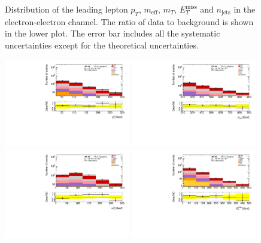 \begin{figure}[htbp]
\begin{center}
\end{center}
\caption{Distribution of the  leading lepton $p_T$, $m_{\text{eff}}$, $m_T$, $E_{T}^{\text{miss}}$ and $n_{\text{jets}}$ in the electron-electron channel. The ratio of data to background is shown in the lower plot. The error bar includes all the systematic uncertainties except for the theoretical uncertainties.}
\label{fig:VRSS_fake_ee}
\end{figure}

\begin{figure}[htbp]
\includegraphics[width=0.49\textwidth]{data/plot/Fake_VR/pt1_VR_Fake_mumu}
\includegraphics[width=0.49\textwidth]{data/plot/Fake_VR/meff_VR_Fake_mumu}\\
\includegraphics[width=0.49\textwidth]{data/plot/Fake_VR/mt1_VR_Fake_mumu}
\includegraphics[width=0.49\textwidth]{data/plot/Fake_VR/MET_VR_Fake_mumu}\\

\end{figure}
